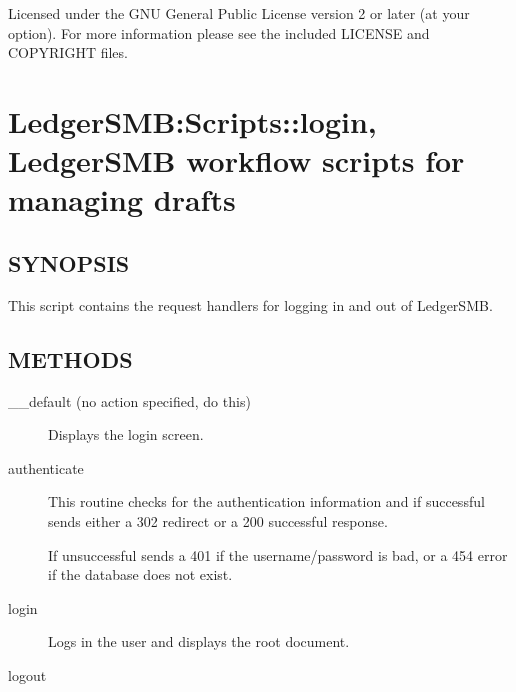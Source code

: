 \begin{description}
Licensed under the GNU General Public License version 2 or later (at your 
option).  For more information please see the included LICENSE and COPYRIGHT 
files.

\section{LedgerSMB:Scripts::login, LedgerSMB workflow scripts for managing drafts\label{LedgerSMB:Scripts::login_LedgerSMB_workflow_scripts_for_managing_drafts}}




\subsection*{SYNOPSIS\label{LedgerSMB:Scripts::login_LedgerSMB_workflow_scripts_for_managing_drafts_SYNOPSIS}}


This script contains the request handlers for logging in and out of LedgerSMB.

\subsection*{METHODS\label{LedgerSMB:Scripts::login_LedgerSMB_workflow_scripts_for_managing_drafts_METHODS}}
\begin{description}

\item[{\_\_default (no action specified, do this)}] \mbox{}

Displays the login screen.


\item[{authenticate}] \mbox{}

This routine checks for the authentication information and if successful
sends either a 302 redirect or a 200 successful response.



If unsuccessful sends a 401 if the username/password is bad, or a 454 error
if the database does not exist.


\item[{login}] \mbox{}

Logs in the user and displays the root document.


\item[{logout}] \mbox{}


\end{description}
\end{description}
